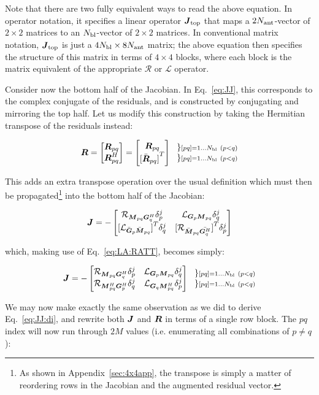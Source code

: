 \documentclass[useAMS,usenatbib]{mn2e}
\newcommand{\mat}[1]{{\bmath{#1}}}
\newcommand{\JJ}{\mat{J}} %
\newcommand{\MM}{\mat{M}}
\newcommand{\RR}{\mat{R}}
\newcommand{\GG}{\mat{G}}
\begin{document}
Note that there are two fully equivalent ways to read the above equation. In operator notation, it specifies a linear operator $\JJ_\mathrm{top}$
that maps a $2N_\mathrm{ant}$-vector of $2\times2$ matrices to an $N_\mathrm{bl}$-vector of $2\times2$ matrices. In conventional matrix notation, 
$\JJ_\mathrm{top}$ is just a $4N_\mathrm{bl}\times8N_\mathrm{ant}$ matrix; the above equation then specifies the structure of this matrix in terms
of $4\times4$ blocks, where each block is the matrix equivalent of the appropriate $\mathcal{R}$ or $\mathcal{L}$ operator.


Consider now the bottom half of the Jacobian. In Eq.~\ref{eq:JJ}, this corresponds to the complex conjugate of the residuals, 
and is constructed by conjugating and mirroring the top half. Let us modify this construction by taking the Hermitian transpose 
of the residuals instead:

\begin{equation}
\bmath{R} = 
\Matrix{c}{
  \RR_{pq} \\ 
  \RR^H_{pq} 
} = 
\Matrix{c}{
  \RR_{pq} \\ 
  {[ \bar{\RR}_{pq} ]}^T
} 
~~ 
\Stack{ 
\} \scriptstyle [pq]=1\dots \Nbl~(p<q) \\ 
\} \scriptstyle [pq]=1\dots \Nbl~(p<q) 
}
\label{eq:RRtranspose}
\end{equation}

This adds an extra transpose operation over the usual definition which must then be propagated\footnote{As shown in Appendix~\ref{sec:4x4app}, the transpose 
is simply a matter of reordering rows in the Jacobian and the augmented residual vector.} into the bottom half of the Jacobian:

\[
\JJ = - \Matrix{cc}{ 
\Rop{ \MM_{pq}\GG^H_q }\delta^j_p & 
\Lop{ \GG_p \MM_{pq}  }\delta^j_q \\
{[ \Lop{ \bar{\GG}_p    \bar{\MM}_{pq} } ]}^T\delta^j_q & 
{[ \Rop{ \bar{\MM}_{pq} \bar{\GG^H_q}  } ]}^T\delta^j_p  
}
\]

which, making use of Eq.~\ref{eq:LA:RATT}, becomes simply:

\[
\JJ = - \Matrix{cc}{ 
\Rop{ \MM_{pq}\GG^H_q }\delta^j_p & 
\Lop{ \GG_p \MM_{pq}  }\delta^j_q \\
\Rop{ \MM^H_{pq} \GG^H_p } \delta^j_q & 
\Lop{ \GG_q \MM^H_{pq}  } \delta^j_p  
}~~ 
\Stack{ 
\} \scriptstyle [pq]=1\dots \Nbl~(p<q) \\ 
\} \scriptstyle [pq]=1\dots \Nbl~(p<q) 
}
\]

We may now make exactly the same observation as we did to derive Eq.~\ref{eq:JJ:di}, and rewrite both $\JJ$ and $\bmath{R}$ in terms of 
a single row block. The $pq$ index will now run through $2M$ values (i.e. enumerating all combinations of $p\ne q$):
\end{document}
